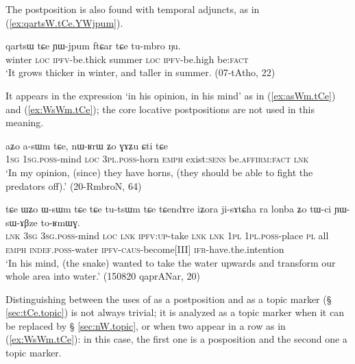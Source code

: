 The postposition  is also found with temporal adjuncts, as in (\ref{ex:qartsW.tCe.YWjpum}).

\begin{exe}
\ex \label{ex:qartsW.tCe.YWjpum}
\gll qartsɯ tɕe ɲɯ-jpum ftɕar tɕe tu-mbro ŋu. \\
winter \textsc{loc} \textsc{ipfv}-be.thick summer \textsc{loc} \textsc{ipfv}-be.high be:\textsc{fact} \\
\glt `It grows thicker in winter, and taller in summer. (07-tAtho, 22)
\end{exe}

It appears in the expression  `in his opinion, in his mind' as in (\ref{ex:asWm.tCe}) and (\ref{ex:WsWm.tCe}); the core locative postpositions are not used in this meaning.

\begin{exe}
\ex \label{ex:asWm.tCe}
\gll aʑo a-sɯm tɕe, nɯ-ʁrɯ ʑo ɣɤʑu ɕti tɕe \\
\textsc{1sg} \textsc{1sg}.\textsc{poss}-mind \textsc{loc} \textsc{3pl}.\textsc{poss}-horn \textsc{emph} exist:\textsc{sens} be.\textsc{affirm}:\textsc{fact} \textsc{lnk} \\
\glt `In my opinion, (since) they have horns, (they should be able to fight the predators off).' (20-RmbroN, 64)
\end{exe}


\begin{exe}
\ex \label{ex:WsWm.tCe}
\gll 
tɕe ɯʑo ɯ-sɯm tɕe tɕe tu-tsɯm tɕe tɕendɤre iʑora ji-sɤtɕha ra lonba ʑo tɯ-ci ɲɯ-sɯ-ɤβze to-ʁmɯɣ. \\
\textsc{lnk} \textsc{3sg} \textsc{3sg}.\textsc{poss}-mind \textsc{loc} \textsc{lnk} \textsc{ipfv}:\textsc{up}-take \textsc{lnk} \textsc{lnk} \textsc{1pl} \textsc{1pl}.\textsc{poss}-place \textsc{pl} all \textsc{emph} \textsc{indef}.\textsc{poss}-water \textsc{ipfv}-\textsc{caus}-become[III] \textsc{ifr}-have.the.intention \\
\glt `In his mind, (the snake) wanted to take the water upwards and transform our whole area into water.' (150820 qaprANar, 20)
\end{exe} 

Distinguishing between the uses of  as a postposition and as a topic marker (§ \ref{sec:tCe.topic}) is not always trivial; it is analyzed as a topic marker when it can be replaced by  § \ref{sec:nW.topic}, or when two  appear in a row as in (\ref{ex:WsWm.tCe}): in this case, the first one is a posposition and the second one a topic marker.


